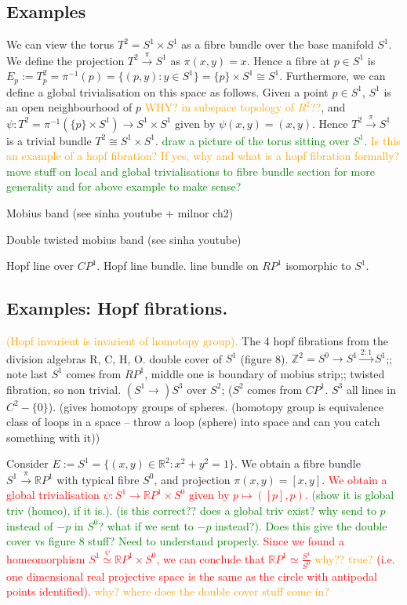 \documentclass[a4paper]{article}
\theoremstyle{definition} \newtheorem*{definition}{Definition}
\theoremstyle{definition} \newtheorem*{definitions}{Definitions}
\theoremstyle{plain} \newtheorem{theorem}{Theorem}[section]
\theoremstyle{plain} \newtheorem{proposition}[theorem]{Proposition}
\theoremstyle{plain} \newtheorem{corollary}[theorem]{Corollary}
\theoremstyle{plain} \newtheorem{lemma}[theorem]{Lemma}
\theoremstyle{plain} \newtheorem{example}[theorem]{Example}
\newcommand{\checkCorrect}[1]{\textcolor{red}{#1}}
\newcommand{\understandBetter}[1]{\textcolor{orange}{#1}}
\newcommand{\question}[1]{\textcolor{orange}{#1}}
\newcommand{\finish}[1]{\textcolor{green}{#1}}
\newcommand{\realnos}{\mathbb{R}}
\begin{document}
\subsection{Examples}
We can view the torus $T^2=S^1\times S^1$ as a fibre bundle over the base manifold $S^1$. We define the projection $T^2 \xrightarrow{\pi} S^1$ as $\pi(x, y)=x$. Hence a fibre at $p\in S^1$ is $E_p := T^2_p = \pi^{-1}(p) = \{(p, y): y\in S^1\} = \{p\}\times S^1 \cong S^1$. Furthermore, we can define a global trivialisation on this space as follows. Given a point $p\in S^1$, $S^1$ is an open neighbourhood of $p$ \question{WHY? in subspace topology of $R^2$??}, and $\psi:T^2=\pi^{-1}(\{p\}\times S^1)\to S^1 \times S^1$ given by $\psi(x, y)=(x, y)$. Hence $T^2 \xrightarrow{\pi} S^1$ is a trivial bundle $T^2\cong S^1\times S^1$. 
\finish{draw a picture of the torus sitting over $S^1$.} \question{Is this an example of a hopf fibration? If yes, why and what is a hopf fibration formally?}
\finish{move stuff on local and global trivialisations to fibre bundle section for more generality and for above example to make sense?}

Mobius band (see sinha youtube + milnor ch2)

Double twisted mobius band (see sinha youtube)

Hopf line over $CP^1$. 
Hopf line bundle. 
line bundle on $RP^1$ isomorphic to $S^1$. 

\subsection{Examples: Hopf fibrations.}
\understandBetter{(Hopf invarient is invarient of homotopy group).}
The 4 hopf fibrations from the division algebras R, C, H, O.
double cover of $S^1$ (figure 8). 
$\mathbb{Z}^2 = S^0 \to S^1 \xrightarrow{2:1} S^1$;; note last $S^1$ comes from $RP^1$, middle one is boundary of mobius strip;; twisted fibration, so non trivial.
$(S^1\to) S^3$ over $S^2$; ($S^2$ comes from $CP^1$. $S^3$ all lines in $C^2 - \{0\}$).
(gives homotopy groups of spheres. (homotopy group is equivalence class of loops in a space -- throw a loop (sphere) into space and can you catch something with it))

 Consider $E:=S^1=\{(x,y)\in \realnos^2:x^2+y^2=1\}$. We obtain a fibre bundle $S^1\xrightarrow{\pi} \realnos P^1$ with typical fibre $S^0$, and projection $\pi(x, y)=[x, y]$. \checkCorrect{We obtain a global trivialisation $\psi:S^1\to \realnos P^1\times S^0$ given by $p\mapsto ([p], p)$.} \finish{(show it is global triv (homeo), if it is.). (is this correct?? does a global triv exist? why send to $p$ instead of $-p$ in $S^0$? what if we sent to $-p$ instead?). Does this give the double cover vs figure 8 stuff? Need to understand properly.} \checkCorrect{Since we found a homeomorphism $S^1\overset{\psi}{\simeq} \realnos P^1\times S^0$, we can conclude that $\realnos P^1 \simeq \frac{S^1}{S^0}$ \question{why?? true?} (i.e. one dimensional real projective space is the same as the circle with antipodal points identified). \question{why?}} \question{where does the double cover stuff come in?}
\end{document}
